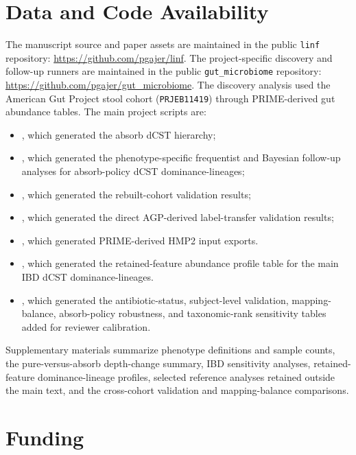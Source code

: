 \documentclass[
  11pt,
]{article}
\providecommand{\tightlist}{%
  \setlength{\itemsep}{0pt}\setlength{\parskip}{0pt}}
\begin{document}
\section{Data and Code
Availability}\label{data-and-code-availability}

The manuscript source and paper assets are maintained in the public
\texttt{linf} repository: \url{https://github.com/pgajer/linf}. The
project-specific discovery and follow-up runners are maintained in the
public \texttt{gut\_microbiome} repository:
\url{https://github.com/pgajer/gut_microbiome}. The discovery analysis
used the American Gut Project stool cohort (\texttt{PRJEB11419}) through
PRIME-derived gut abundance tables. The main project scripts
are:

\begin{itemize}
\tightlist
\item {}, which generated the absorb
dCST hierarchy;
\item {}, which generated the
phenotype-specific frequentist and Bayesian follow-up analyses for
absorb-policy dCST dominance-lineages;
\item {}, which
generated the rebuilt-cohort validation results;
\item {}, which
generated the direct AGP-derived label-transfer validation results;
\item {}, which
generated PRIME-derived HMP2 input exports.
\item {}, which generated the
retained-feature abundance profile table for the main IBD dCST
dominance-lineages.
\item {}, which generated
the antibiotic-status, subject-level validation, mapping-balance,
absorb-policy robustness, and taxonomic-rank sensitivity tables added
for reviewer calibration.
\end{itemize}

Supplementary materials summarize phenotype definitions and sample
counts, the pure-versus-absorb depth-change summary, IBD sensitivity
analyses, retained-feature dominance-lineage profiles, selected reference analyses
retained outside the main text, and the cross-cohort validation and
mapping-balance comparisons.

\section{Funding}\label{funding}
\end{document}
